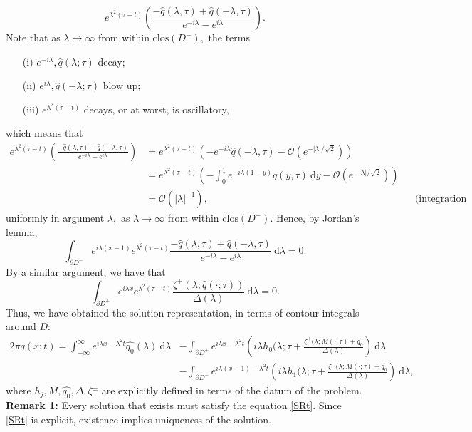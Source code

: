 \[ 
e^{\lambda^2(\tau - t)} 
\left( 
\frac{-\widehat{q}(\lambda, \tau) + \widehat{q}(-\lambda, \tau)}{e^{-i\lambda} - e^{i\lambda}}
\right).
\]
Note that as $\lambda \to \infty$ from within $\text{clos}(D^-),$ the terms 
\begin{enumerate}
\item[(i)] $e^{-i\lambda}, \widehat{q}(\lambda; \tau)$ decay;
\item[(ii)] $e^{i\lambda}, \widehat{q}(-\lambda; \tau)$ blow up;
\item[(iii)] $e^{\lambda^2(\tau - t)}$ decays, or at worst, is oscillatory,
\end{enumerate}
which means that 
\begin{align*}
e^{\lambda^2(\tau - t)} 
\left( 
\frac{-\widehat{q}(\lambda, \tau) + \widehat{q}(-\lambda, \tau)}{e^{-i\lambda} - e^{i\lambda}}
\right)
 &= e^{\lambda^2(\tau - t)} 
\left( 
- e^{-i\lambda}\widehat{q}(-\lambda, \tau)  - \mathcal{O}(e^{-|\lambda|/\sqrt{2}} )
\right)
\\
&= e^{\lambda^2(\tau - t)} 
\left( 
- \int^1_0 e^{-i\lambda(1 - y)} q(y, \tau)~\mathrm{d}y  - \mathcal{O}(e^{-|\lambda|/\sqrt{2}})
\right)
\\ 
&= \mathcal{O}(|\lambda|^{-1}), &&\text{(integration by parts)}
\end{align*}
uniformly in argument $\lambda,$ as $\lambda \to \infty$ from within $\text{clos}(D^-).$ Hence, by Jordan's lemma, 
\[ 
\int_{\partial D^-} e^{i\lambda(x-1)} e^{\lambda^2(\tau - t)}\frac{- \widehat{q}(\lambda, \tau) + \widehat{q}(-\lambda, \tau)}{e^{-i\lambda} - e^{i \lambda}} ~\mathrm{d}\lambda = 0.
\]
By a similar argument, we have that 
\[ 
\int_{\partial D^+} e^{i\lambda x} e^{\lambda^2(\tau - t)}\frac{\zeta^+ (\lambda; \widehat{q}(\cdot; \tau))}{\Delta (\lambda)} ~\mathrm{d}\lambda = 0.
\]
Thus, we have obtained the solution representation, in terms of contour integrals around $D:$
\begin{equation}\label{SRt}
\begin{aligned}
2 \pi q(x;t) = \int^{\infty}_{-\infty} e^{i\lambda x - \lambda^2 t} \widehat{q_0}(\lambda) ~\mathrm{d}\lambda &- 
\int_{\partial D^+}  e^{i\lambda x - \lambda^2 t} \left( i \lambda h_0(\lambda; \tau + \frac{\zeta^+(\lambda; M(\cdot; \tau) + \widehat{q_0}}{\Delta(\lambda)}\right)~\mathrm{d}\lambda \\
&- 
\int_{\partial D^-} e^{i\lambda(x-1) - \lambda^2 t} \left( i \lambda h_1(\lambda; \tau + \frac{\zeta^-(\lambda; M(\cdot; \tau) + \widehat{q_0}}{\Delta(\lambda)}\right) ~\mathrm{d}\lambda,
\end{aligned}
\tag{SR$\tau$}
\end{equation}
where $h_j, M, \widehat{q_0}, \Delta, \zeta^{\pm}$ are explicitly defined in terms of the datum of the problem. 
\newline \textbf{Remark 1:} Every solution that exists must satisfy the equation \eqref{SRt}. Since \eqref{SRt} is explicit, existence implies uniqueness of the solution.